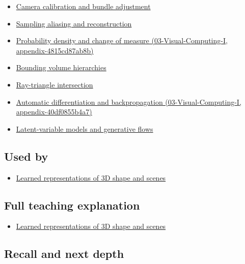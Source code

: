 \begin{itemize}
\tightlist
\item
  \hyperref[appendix-3ee9861904d5]{Camera calibration and bundle adjustment}
\item
  \hyperref[appendix-6a7869dd79a6]{Sampling aliasing and reconstruction}
\item
  \href{../03-Visual-Computing-I/main.pdf\#nameddest=appendix-4815cd87ab8b}{Probability density and change of measure (03-Visual-Computing-I, appendix-4815cd87ab8b)}
\item
  \hyperref[appendix-0b426c47dd78]{Bounding volume hierarchies}
\item
  \hyperref[appendix-47ac1bd6d144]{Ray-triangle intersection}
\item
  \href{../03-Visual-Computing-I/main.pdf\#nameddest=appendix-40df0855b4a7}{Automatic differentiation and backpropagation (03-Visual-Computing-I, appendix-40df0855b4a7)}
\item
  \hyperref[appendix-2c568f05ee34]{Latent-variable models and generative flows}
\end{itemize}

\subsection{Used by}\label{appendix-c5b332e400e7-used-by}

\begin{itemize}
\tightlist
\item
  \hyperref[04-visual-computing-ii-ch034-learned-representations-of-3d-shape-and-scenes]{Learned representations of 3D shape and scenes}
\end{itemize}

\subsection{Full teaching explanation}\label{appendix-c5b332e400e7-full-teaching-explanation}

\begin{itemize}
\tightlist
\item
  \hyperref[04-visual-computing-ii-ch034-learned-representations-of-3d-shape-and-scenes]{Learned representations of 3D shape and scenes}
\end{itemize}

\subsection{Recall and next depth}\label{appendix-c5b332e400e7-recall-and-next-depth}

